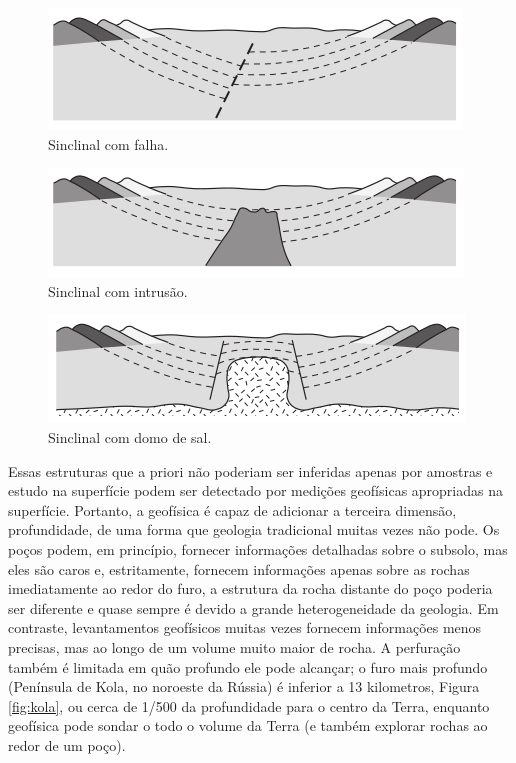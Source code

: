 \documentclass[]{book}
\theoremstyle{definition}
\theoremstyle{definition}
\theoremstyle{definition}
\theoremstyle{remark}
\begin{document}
\begin{figure}

{\centering \includegraphics[width=0.7\linewidth]{fig/Fig_01.02} 

}

\caption{Sinclinal com falha.}\label{fig:falha}
\end{figure}

\begin{figure}

{\centering \includegraphics[width=0.7\linewidth]{fig/Fig_01.03} 

}

\caption{Sinclinal com intrusão.}\label{fig:intrusao}
\end{figure}

\begin{figure}

{\centering \includegraphics[width=0.7\linewidth]{fig/Fig_01.04} 

}

\caption{Sinclinal com domo de sal.}\label{fig:sal}
\end{figure}

Essas estruturas que a priori não poderiam ser inferidas apenas por amostras e estudo na superfície podem ser detectado por medições geofísicas apropriadas na superfície. Portanto, a geofísica é capaz de adicionar a terceira dimensão, profundidade, de uma forma que geologia tradicional muitas vezes não pode. Os poços podem, em princípio, fornecer informações detalhadas sobre o subsolo, mas eles são caros e, estritamente, fornecem informações apenas sobre as rochas imediatamente ao redor do furo, a estrutura da rocha distante do poço poderia ser diferente e quase sempre é devido a grande heterogeneidade da geologia. Em contraste, levantamentos geofísicos muitas vezes fornecem informações menos precisas, mas ao longo de um volume muito maior de rocha. A perfuração também é limitada em quão profundo ele pode alcançar; o furo mais profundo (Península de Kola, no noroeste da Rússia) é inferior a 13 kilometros, Figura \ref{fig:kola}, ou cerca de 1/500 da profundidade para o centro da Terra, enquanto geofísica pode sondar o todo o volume da Terra (e também explorar rochas ao redor de um poço).
\end{document}
